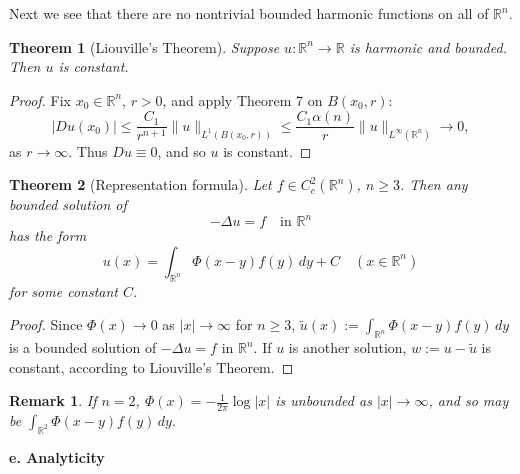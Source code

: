 \documentclass[a4paper,12pt]{report}
\newtheorem{theorem}{Theorem}[section]
\newtheorem{remark}{Remark}[section]
\begin{document}
Next we see that there are no nontrivial bounded harmonic functions on all of $\mathbb{R}^n$.
\begin{theorem}[Liouville's Theorem]
Suppose $u : \mathbb{R}^n \to \mathbb{R}$ is harmonic and bounded. Then $u$ is constant.
\end{theorem}
\begin{proof}
Fix $x_0 \in \mathbb{R}^n$, $r > 0$, and apply Theorem 7 on $B(x_0, r)$:
\[
|Du(x_0)| \leq \frac{C_1}{r^{n+1}} \|u\|_{L^1(B(x_0, r))}
\leq \frac{C_1 \alpha(n)}{r} \|u\|_{L^\infty(\mathbb{R}^n)} \to 0,
\]
as $r \to \infty$. Thus $Du \equiv 0$, and so $u$ is constant.
\end{proof}
\begin{theorem}[Representation formula]
Let $f \in C^2_c(\mathbb{R}^n)$, $n \geq 3$. Then any bounded solution of
\[
-\Delta u = f \quad \text{in } \mathbb{R}^n
\]
has the form
\[
u(x) = \int_{\mathbb{R}^n} \Phi(x - y) f(y) \, dy + C \quad (x \in \mathbb{R}^n)
\]
for some constant $C$.
\end{theorem}
\begin{proof}
Since $\Phi(x) \to 0$ as $|x| \to \infty$ for $n \geq 3$, $\tilde{u}(x) := \int_{\mathbb{R}^n} \Phi(x - y) f(y) \, dy$ is a bounded solution of $-\Delta u = f$ in $\mathbb{R}^n$. If $u$ is another solution, $w := u - \tilde{u}$ is constant, according to Liouville's Theorem.
\end{proof}

\begin{remark}
If $n = 2$, $\Phi(x) = -\frac{1}{2\pi} \log |x|$ is unbounded as $|x| \to \infty$, and so may be $\int_{\mathbb{R}^2} \Phi(x - y) f(y) \, dy$.
\end{remark}
\noindent
\textbf{e. Analyticity}
\end{document}
